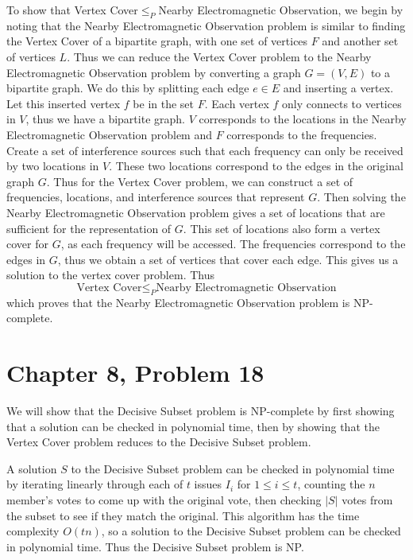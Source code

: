 \documentclass[12pt]{article}
\begin{document}
To show that Vertex Cover\(\leq_P\)Nearby Electromagnetic Observation, we begin by noting that the Nearby Electromagnetic Observation
problem is similar to finding the Vertex Cover of a bipartite graph, with one set of vertices \(F\) and another set of vertices \(L\). Thus we can reduce
the Vertex Cover problem to the Nearby Electromagnetic Observation problem by converting a graph \(G=(V,E)\) to a bipartite graph. We do this by splitting
each edge \(e\in E\) and inserting a vertex. Let this inserted vertex \(f\) be in the set \(F\). Each vertex \(f\) only connects to vertices in \(V\), thus
we have a bipartite graph. \(V\) corresponds to the locations in the Nearby Electromagnetic Observation problem and \(F\) corresponds to the frequencies.
Create a set of interference sources such that each frequency can only be received by two locations in \(V\). These two locations correspond to the edges in the original
graph \(G\). Thus for the Vertex Cover problem, we can construct a set of frequencies, locations, and interference sources that represent \(G\). Then solving
the Nearby Electromagnetic Observation problem gives a set of locations that are sufficient for the representation of \(G\). This set of locations also form
a vertex cover for \(G\), as each frequency will be accessed. The frequencies correspond to the edges in \(G\), thus we obtain a set of vertices that cover
each edge. This gives us a solution to the vertex cover problem. Thus
\[\text{Vertex Cover}\leq_P\text{Nearby Electromagnetic Observation}\]
which proves that the Nearby Electromagnetic Observation problem is NP-complete.

\pagebreak

\section*{Chapter 8, Problem 18}

We will show that the Decisive Subset problem is NP-complete by first showing
that a solution can be checked in polynomial time, then by showing that the Vertex Cover problem reduces
to the Decisive Subset problem.

A solution \(S\) to the Decisive Subset problem can be checked in polynomial time by iterating linearly through
each of \(t\) issues \(I_i\) for \(1\leq i\leq t\), counting the \(n\) member's votes to come up with the original vote,
then checking \(|S|\) votes from the subset to see if they match the original. This algorithm has the time complexity \(O(tn)\),
so a solution to the Decisive Subset problem can be checked in polynomial time. Thus the Decisive Subset problem is NP.
\end{document}
